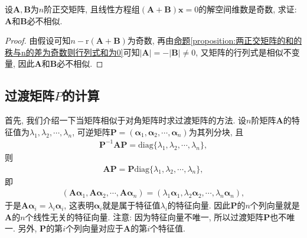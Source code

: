 \documentclass[../../main.tex]{subfiles}
\begin{document}
\begin{example}
设\(\boldsymbol{A},\boldsymbol{B}\)为\(n\)阶正交矩阵, 且线性方程组\((\boldsymbol{A}+\boldsymbol{B})\boldsymbol{x} = 0\)的解空间维数是奇数, 求证: \(\boldsymbol{A}\)和\(\boldsymbol{B}\)必不相似.
\end{example}
\begin{proof}
由假设可知\(n - \mathrm{r}(\boldsymbol{A}+\boldsymbol{B})\)为奇数, 再由\hyperref[proposition:两正交矩阵的和的秩与n的差为奇数则行列式和为0]{命题\ref{proposition:两正交矩阵的和的秩与n的差为奇数则行列式和为0}}可知\(\vert\boldsymbol{A}\vert = -\vert\boldsymbol{B}\vert\neq 0\), 又矩阵的行列式是相似不变量, 因此\(\boldsymbol{A}\)和\(\boldsymbol{B}\)必不相似. 
\end{proof}

\subsection{过渡矩阵$P$的计算}

首先, 我们介绍一下当矩阵相似于对角矩阵时求过渡矩阵的方法. 设\(n\)阶矩阵\(\boldsymbol{A}\)的特征值为\(\lambda_{1},\lambda_{2},\cdots,\lambda_{n}\), 可逆矩阵\(\boldsymbol{P}=(\boldsymbol{\alpha}_{1},\boldsymbol{\alpha}_{2},\cdots,\boldsymbol{\alpha}_{n})\)为其列分块, 且
\begin{align*}
\boldsymbol{P}^{-1}\boldsymbol{AP}=\mathrm{diag}\{\lambda_{1},\lambda_{2},\cdots,\lambda_{n}\},
\end{align*}
则
\begin{align*}
\boldsymbol{AP}=\boldsymbol{P}\mathrm{diag}\{\lambda_{1},\lambda_{2},\cdots,\lambda_{n}\},
\end{align*}
即
\begin{align*}
(\boldsymbol{A}\boldsymbol{\alpha}_{1},\boldsymbol{A}\boldsymbol{\alpha}_{2},\cdots,\boldsymbol{A}\boldsymbol{\alpha}_{n})=(\lambda_{1}\boldsymbol{\alpha}_{1},\lambda_{2}\boldsymbol{\alpha}_{2},\cdots,\lambda_{n}\boldsymbol{\alpha}_{n}),
\end{align*}
于是\(\boldsymbol{A}\boldsymbol{\alpha}_{i}=\lambda_{i}\boldsymbol{\alpha}_{i}\), 这表明\(\boldsymbol{\alpha}_{i}\)就是属于特征值\(\lambda_{i}\)的特征向量. 因此\(\boldsymbol{P}\)的\(n\)个列向量就是\(\boldsymbol{A}\)的\(n\)个线性无关的特征向量. 注意: 因为特征向量不唯一, 所以过渡矩阵\(\boldsymbol{P}\)也不唯一. 另外, \(\boldsymbol{P}\)的第\(i\)个列向量对应于\(\boldsymbol{A}\)的第\(i\)个特征值. 
\end{document}
